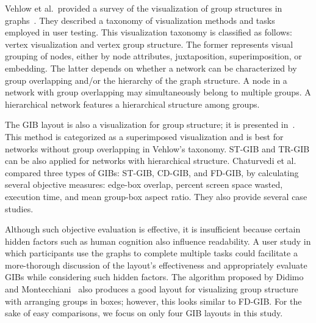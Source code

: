 \documentclass{vgtc}                          %
\begin{document}
Vehlow et al.\ provided a survey of the visualization of group structures in graphs~\cite{Vehlow2017VisualizingGS}.
They described a taxonomy of visualization methods and tasks employed in user testing.
This visualization taxonomy is classified as follows: vertex visualization and vertex group structure.
The former represents visual grouping of nodes, either by node attributes, juxtaposition, superimposition, or embedding.
The latter depends on whether a network can be characterized by group overlapping and/or the hierarchy of the graph structure.
A node in a network with group overlapping may simultaneously belong to multiple groups.
A hierarchical network features a hierarchical structure among groups.

The GIB layout is also a visualization for group structure; it is presented in~\cite{rodrigues2011group,chaturvedi2014group,onoue2017optimal}.
This method is categorized as a superimposed visualization and is best for networks without group overlapping in Vehlow's taxonomy. ST-GIB and TR-GIB can be also applied for networks with hierarchical structure.
Chaturvedi et al.~\cite{chaturvedi2014group} compared three types of GIBs: ST-GIB, CD-GIB, and FD-GIB, by calculating several objective measures: edge-box overlap, percent screen space wasted, execution time, and mean group-box aspect ratio.
They also provide several case studies.

Although such objective evaluation is effective, it is insufficient because certain hidden factors such as human cognition also influence readability. A user study in which participants use the graphs to complete multiple tasks could facilitate a more-thorough discussion of the layout's effectiveness and appropriately evaluate GIBs while considering such hidden factors.
The algorithm proposed by Didimo and Montecchiani~\cite{6295786} also produces a good layout for visualizing group structure with arranging groups in boxes; however, this looks similar to FD-GIB.
For the sake of easy comparisons, we focus on only four GIB layouts in this study.
\end{document}

